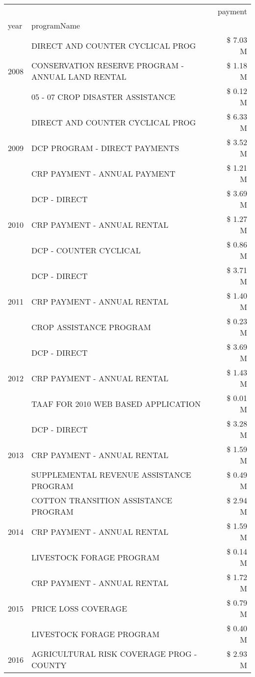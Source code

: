 \begin{tabular}{llr}
\toprule
 &  & payment \\
year & programName &  \\
\midrule
\multirow[t]{3}{*}{2008} & DIRECT AND COUNTER CYCLICAL PROG & \$ 7.03 M \\
 & CONSERVATION RESERVE PROGRAM - ANNUAL LAND RENTAL & \$ 1.18 M \\
 & 05 - 07 CROP DISASTER ASSISTANCE & \$ 0.12 M \\
\cline{1-3}
\multirow[t]{3}{*}{2009} & DIRECT AND COUNTER CYCLICAL PROG & \$ 6.33 M \\
 & DCP PROGRAM - DIRECT PAYMENTS & \$ 3.52 M \\
 & CRP PAYMENT - ANNUAL PAYMENT & \$ 1.21 M \\
\cline{1-3}
\multirow[t]{3}{*}{2010} & DCP - DIRECT & \$ 3.69 M \\
 & CRP PAYMENT - ANNUAL RENTAL & \$ 1.27 M \\
 & DCP - COUNTER CYCLICAL & \$ 0.86 M \\
\cline{1-3}
\multirow[t]{3}{*}{2011} & DCP - DIRECT & \$ 3.71 M \\
 & CRP PAYMENT - ANNUAL RENTAL & \$ 1.40 M \\
 & CROP ASSISTANCE PROGRAM & \$ 0.23 M \\
\cline{1-3}
\multirow[t]{3}{*}{2012} & DCP - DIRECT & \$ 3.69 M \\
 & CRP PAYMENT - ANNUAL RENTAL & \$ 1.43 M \\
 & TAAF FOR 2010 WEB BASED APPLICATION & \$ 0.01 M \\
\cline{1-3}
\multirow[t]{3}{*}{2013} & DCP - DIRECT & \$ 3.28 M \\
 & CRP PAYMENT - ANNUAL RENTAL & \$ 1.59 M \\
 & SUPPLEMENTAL REVENUE ASSISTANCE PROGRAM & \$ 0.49 M \\
\cline{1-3}
\multirow[t]{3}{*}{2014} & COTTON TRANSITION ASSISTANCE PROGRAM & \$ 2.94 M \\
 & CRP PAYMENT - ANNUAL RENTAL & \$ 1.59 M \\
 & LIVESTOCK FORAGE PROGRAM & \$ 0.14 M \\
\cline{1-3}
\multirow[t]{3}{*}{2015} & CRP PAYMENT - ANNUAL RENTAL & \$ 1.72 M \\
 & PRICE LOSS COVERAGE & \$ 0.79 M \\
 & LIVESTOCK FORAGE PROGRAM & \$ 0.40 M \\
\cline{1-3}
\multirow[t]{3}{*}{2016} & AGRICULTURAL RISK COVERAGE PROG - COUNTY & \$ 2.93 M \\

\end{tabular}

